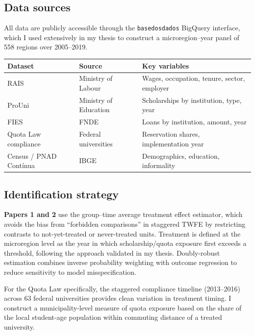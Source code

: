 \documentclass[a4paper,11pt]{article}
\begin{document}
\subsection{Data sources}

All data are publicly accessible through the \texttt{basedosdados} BigQuery interface, which I used extensively in my thesis to construct a microregion--year panel of 558 regions over 2005--2019.

\begin{table}[h]
\centering
\small
\begin{tabular}{@{}lll@{}}
\toprule
\textbf{Dataset} & \textbf{Source} & \textbf{Key variables} \\
\midrule
RAIS & Ministry of Labour & Wages, occupation, tenure, sector, employer \\
ProUni & Ministry of Education & Scholarships by institution, type, year \\
FIES & FNDE & Loans by institution, amount, year \\
Quota Law compliance & Federal universities & Reservation shares, implementation year \\
Census / PNAD Cont\'inua & IBGE & Demographics, education, informality \\
\bottomrule
\end{tabular}
\end{table}

\subsection{Identification strategy}

\textbf{Papers 1 and 2} use the \citet{callaway2021} group--time average treatment effect estimator, which avoids the bias from ``forbidden comparisons'' in staggered TWFE by restricting contrasts to not-yet-treated or never-treated units. Treatment is defined at the microregion level as the year in which scholarship/quota exposure first exceeds a threshold, following the approach validated in my thesis. Doubly-robust estimation combines inverse probability weighting with outcome regression to reduce sensitivity to model misspecification.

For the Quota Law specifically, the staggered compliance timeline (2013--2016) across 63 federal universities provides clean variation in treatment timing. I construct a municipality-level measure of quota exposure based on the share of the local student-age population within commuting distance of a treated university.
\end{document}

